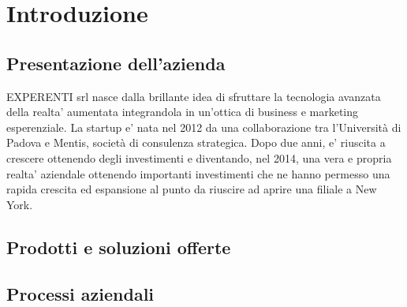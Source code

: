 \section{Introduzione}
\subsection{Presentazione dell'azienda}
EXPERENTI srl nasce dalla brillante idea di sfruttare la tecnologia avanzata della realta' aumentata integrandola in un'ottica di business e marketing esperenziale.
La startup e' nata nel 2012 da una collaborazione tra l’Università di Padova e Mentis, società di consulenza strategica. Dopo due anni, e' riuscita a crescere ottenendo degli investimenti e diventando, nel 2014, una vera e propria realta' aziendale ottenendo importanti investimenti che ne hanno permesso una rapida crescita ed espansione al punto da riuscire ad aprire una filiale a New York.


\subsection{Prodotti e soluzioni offerte}

\subsection{Processi aziendali}
